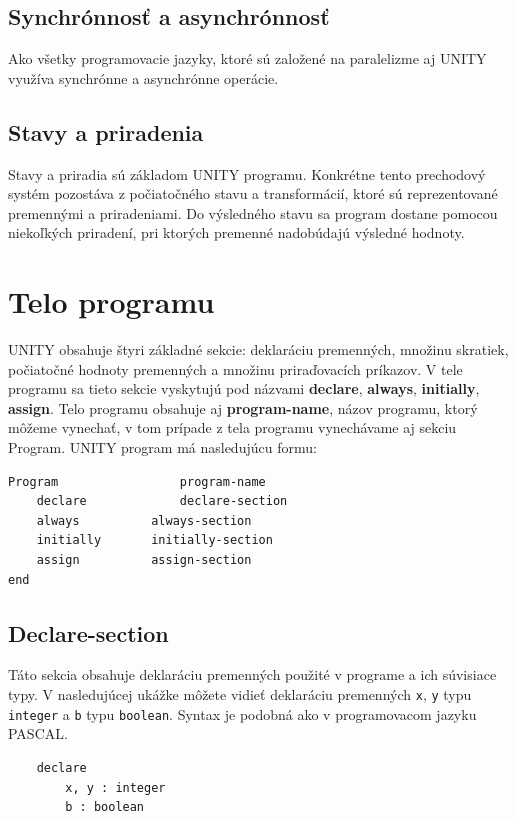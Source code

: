 \subsection{Synchrónnosť a asynchrónnosť}
Ako všetky programovacie jazyky, ktoré sú založené na paralelizme aj UNITY využíva synchrónne a asynchrónne operácie. 

\subsection{Stavy a priradenia}
Stavy a priradia sú základom UNITY programu. Konkrétne tento prechodový systém pozostáva z počiatočného stavu a transformácií, 
ktoré sú reprezentované premennými a priradeniami. Do výsledného stavu sa program dostane pomocou niekoľkých priradení, pri ktorých 
premenné nadobúdajú výsledné hodnoty.

\section{Telo programu}

UNITY obsahuje štyri základné sekcie: deklaráciu premenných, množinu skratiek, 
počiatočné hodnoty premenných a množinu priraďovacích príkazov. 
V tele programu sa tieto sekcie vyskytujú pod názvami \textbf{declare}, \textbf{always}, 
\textbf{initially}, \textbf{assign}. Telo programu obsahuje aj \textbf{program-name}, 
názov programu, 
ktorý môžeme vynechať, v tom prípade z tela programu vynechávame aj sekciu Program.  
UNITY program má nasledujúcu formu: \cite{br6}

\begin{lstlisting}
Program 				program-name
	declare 			declare-section
	always	 		always-section
	initially 		initially-section
	assign 			assign-section
end
\end{lstlisting}


\subsection{Declare-section}

Táto sekcia obsahuje deklaráciu premenných použité v programe a ich súvisiace typy. 
V nasledujúcej ukážke môžete vidieť deklaráciu premenných \texttt{x}, \texttt{y} typu \texttt{integer}
a \texttt{b} typu \texttt{boolean}. 
Syntax je podobná ako v programovacom jazyku PASCAL. 
\begin{lstlisting}
	declare 
		x, y : integer
		b : boolean
\end{lstlisting}

